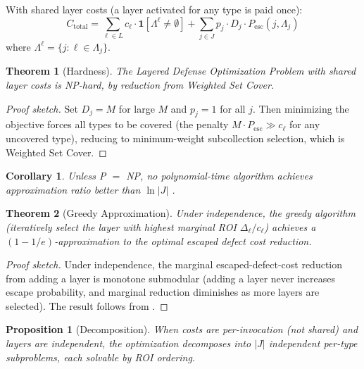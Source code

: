 \documentclass[11pt, a4paper, logo, copyright]{googledeepmind}
\newtheorem{theorem}{Theorem}[section]
\newtheorem{proposition}{Proposition}[section]
\newtheorem{corollary}{Corollary}[section]
\newcommand{\Pesc}{P_{\mathrm{esc}}}
\begin{document}
With shared layer costs (a layer activated for any type is paid once):
\begin{equation}
\label{eq:objective}
C_{\mathrm{total}} = \sum_{\ell \in L} c_\ell \cdot \mathbf{1}[\Lambda^\ell \neq \emptyset] + \sum_{j \in J} p_j \cdot D_j \cdot \Pesc(j, \Lambda_j)
\end{equation}
where $\Lambda^\ell = \{j : \ell \in \Lambda_j\}$.

\begin{theorem}[Hardness]
\label{thm:nphard}
The Layered Defense Optimization Problem with shared layer costs is NP-hard, by reduction from Weighted Set Cover.
\end{theorem}

\begin{proof}[Proof sketch]
Set $D_j = M$ for large $M$ and $p_j = 1$ for all $j$. Then minimizing the objective forces all types to be covered (the penalty $M \cdot \Pesc \gg c_\ell$ for any uncovered type), reducing to minimum-weight subcollection selection, which is Weighted Set Cover.
\end{proof}

\begin{corollary}
\label{cor:inapprox}
Unless P $=$ NP, no polynomial-time algorithm achieves approximation ratio better than $\ln|J|$ \citep{dinur2014}.
\end{corollary}

\begin{theorem}[Greedy Approximation]
\label{thm:greedy}
Under independence, the greedy algorithm (iteratively select the layer with highest marginal ROI $\Delta_\ell / c_\ell$) achieves a $(1-1/e)$-approximation to the optimal escaped defect cost reduction.
\end{theorem}

\begin{proof}[Proof sketch]
Under independence, the marginal escaped-defect-cost reduction from adding a layer is monotone submodular (adding a layer never increases escape probability, and marginal reduction diminishes as more layers are selected). The result follows from \citet{nemhauser1978}.
\end{proof}

\begin{proposition}[Decomposition]
\label{prop:decomp}
When costs are per-invocation (not shared) and layers are independent, the optimization decomposes into $|J|$ independent per-type subproblems, each solvable by ROI ordering.
\end{proposition}
\end{document}
